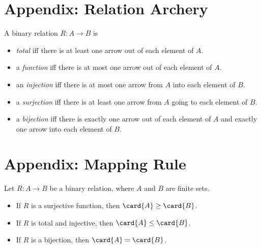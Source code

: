 \documentclass[handout]{mcs}
\begin{document}

\section*{Appendix: Relation Archery}

A binary relation $R:A \to B$ is
\begin{itemize}

\item \emph{total} iff there is at least one arrow out of each element of $A$.

\iffalse
Formally, $\forall a \in A\, \exists  b \in B.\ a\mrel{R}b$.
\fi

\item a \emph{function} iff there is at most one arrow out of each element of
  $A$.

\iffalse
Formally, $\forall a \in A\, \forall b,c \in B.\ [ a\mrel{R}b
  \QAND a\mrel{R}c] \QIMPLIES b=c$.
\fi

\item an \emph{injection} iff there is at most one arrow from $A$ into
  each element of $B$.

\iffalse
  Formally, $\forall a,a' \in A\, \forall b \in
  B.[\ a \mrel{R} b \QAND a' \mrel{R} b] \QIMPLIES a=a'$.
\fi

\item a \emph{surjection} iff there is at least one arrow from $A$ going
  to each element of $B$.

\iffalse
Formally, $\forall b \in B\, \exists a \in
  A.\ a\mrel{R}b$.
\fi

\item a \emph{bijection} iff there is exactly one arrow out of each
element of $A$ and exactly one arrow into each element of $B$.
\end{itemize}

\section*{Appendix: Mapping Rule}

Let $R: A \to B$ be a binary relation, where $A$ and $B$ are finite sets.

\begin{itemize}

\item\label{mapping-sur} If $R$ is a surjective function, then $\card{A} \geq \card{B}$.

\item\label{mapping-inj} If $R$ is total and injective, then $\card{A} \leq \card{B}$.

\item\label{mapping-bij} If $R$ is a bijection, then $\card{A} = \card{B}$.

\end{itemize}
\end{document}
